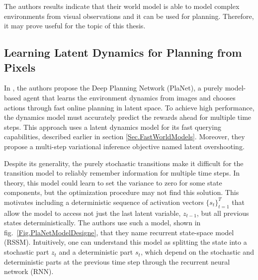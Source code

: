The authors results indicate that their world model is able to model complex environments from visual observations and it can be used for planning. Therefore, it may prove useful for the topic of this thesis.

\subsection{Learning Latent Dynamics for Planning from Pixels}

In \cite{Algo.PlaNet}, the authors propose the Deep Planning Network (PlaNet), a purely model-based agent that learns the environment dynamics from images and chooses actions through fast online planning in latent space. To achieve high performance, the dynamics model must accurately predict the rewards ahead for multiple time steps. This approach uses a latent dynamics model for its fast querying capabilities, described earlier in section \ref{Sec.FastWorldModels}. Moreover, they propose a multi-step variational inference objective named latent overshooting.

Despite its generality, the purely stochastic transitions make it difficult for the transition model to reliably remember information for multiple time steps. In theory, this model could learn to set the variance to zero for some state components, but the optimization procedure may not find this solution. This motivates including a deterministic sequence of activation vectors $\{s_t\}^T_{t=1}$ that allow the model to access not just the last latent variable, $z_{t-1}$, but all previous states deterministically. The authors use such a model, shown in fig.~\ref{Fig.PlaNetModelDesigne}, that they name recurrent state-space model (RSSM). Intuitively, one can understand this model as splitting the state into a stochastic part $z_t$ and a deterministic part $s_t$, which depend on the stochastic and deterministic parts at the previous time step through the recurrent neural network (RNN).

